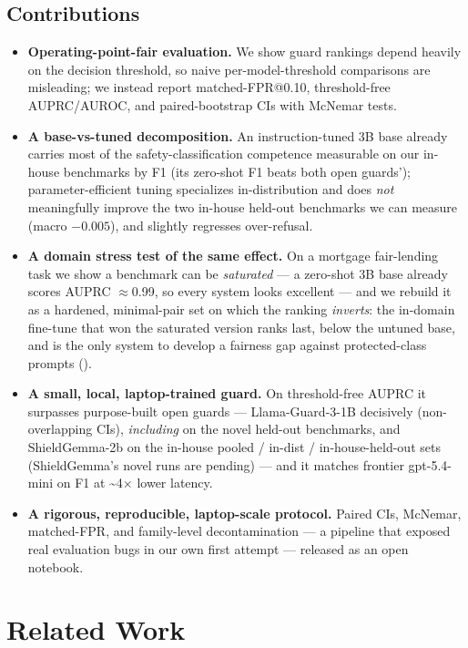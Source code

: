 \documentclass[sigconf,nonacm]{acmart}
\begin{document}
\subsection{Contributions}

\begin{itemize}
  \item \textbf{Operating-point-fair evaluation.} We show guard rankings depend heavily on the decision threshold, so naive per-model-threshold comparisons are misleading; we instead report matched-FPR@0.10, threshold-free AUPRC/AUROC, and paired-bootstrap CIs with McNemar tests.
  \item \textbf{A base-vs-tuned decomposition.} An instruction-tuned 3B base already carries most of the safety-classification competence measurable on our in-house benchmarks by F1 (its zero-shot F1 beats both open guards'); parameter-efficient tuning specializes in-distribution and does \emph{not} meaningfully improve the two in-house held-out benchmarks we can measure (macro $-0.005$), and slightly regresses over-refusal.
  \item \textbf{A domain stress test of the same effect.} On a mortgage fair-lending task we show a benchmark can be \emph{saturated} --- a zero-shot 3B base already scores AUPRC $\approx$0.99, so every system looks excellent --- and we rebuild it as a hardened, minimal-pair set on which the ranking \emph{inverts}: the in-domain fine-tune that won the saturated version ranks last, below the untuned base, and is the only system to develop a fairness gap against protected-class prompts ().
  \item \textbf{A small, local, laptop-trained guard.} On threshold-free AUPRC it surpasses purpose-built open guards --- Llama-Guard-3-1B decisively (non-overlapping CIs), \emph{including} on the novel held-out benchmarks, and ShieldGemma-2b on the in-house pooled / in-dist / in-house-held-out sets (ShieldGemma's novel runs are pending) --- and it matches frontier gpt-5.4-mini on F1 at \textasciitilde{}4$\times$ lower latency.
  \item \textbf{A rigorous, reproducible, laptop-scale protocol.} Paired CIs, McNemar, matched-FPR, and family-level decontamination --- a pipeline that exposed real evaluation bugs in our own first attempt --- released as an open notebook.
\end{itemize}

\section{Related Work}
\end{document}
